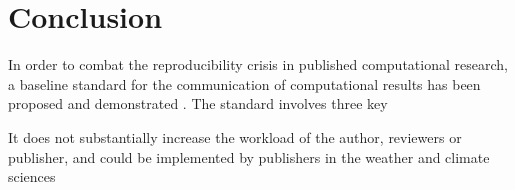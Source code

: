 \section{Conclusion}

In order to combat the reproducibility crisis in published computational research, a baseline standard for the communication of computational results has been proposed and demonstrated \citep{Irving2015}. The standard involves three key 


It does not substantially increase the workload of the author, reviewers or publisher, and could be implemented by publishers in the weather and climate sciences